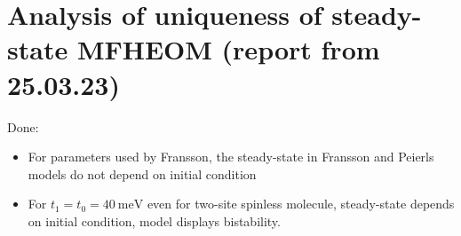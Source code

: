\documentclass{article}
\begin{document}
\section{Analysis of uniqueness of steady-state MFHEOM (report from 25.03.23)}
Done:
\begin{itemize}
	\item For parameters used by Fransson, the steady-state in Fransson and Peierls models do not depend on initial condition
	\item For $t_1=t_0=\SI{40}{\milli\electronvolt}$ even for two-site spinless molecule, steady-state depends on initial condition, model displays bistability. 
\end{itemize}
\end{document}
